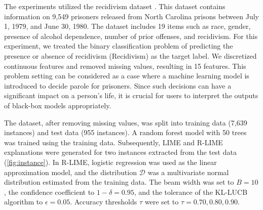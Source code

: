 \documentclass[runningheads]{llncs}
\begin{document}
The experiments utilized the recidivism dataset \cite{schmidt1988predicting}.
This dataset contains information on 9,549 prisoners released from
North Carolina prisons between July 1, 1979, and June 30, 1980.
The dataset includes 19 items such as race, gender,
presence of alcohol dependence, number of prior offenses, and recidivism.
For this experiment, 
we treated the binary classification problem of predicting
the presence or absence of recidivism (Recidivism) as the target label. 
We discretized continuous features and removed missing values,
resulting in 15 features. 
This problem setting can be considered as a case
where a machine learning model is introduced to decide parole for prisoners.
Since such decisions can have a significant impact on a person's life,
it is crucial for users to interpret the outputs of black-box models appropriately.

The dataset, after removing missing values,
was split into training data (7,639 instances) and test data (955 instances).
A random forest model with 50 trees was trained using the training data.
Subsequently, LIME and R-LIME explanations were generated
for two instances extracted from the test data (\cref{fig:instance}).
In R-LIME, logistic regression was used as the linear approximation model, 
and the distribution $\mathcal{D}$ was a multivariate normal distribution
estimated from the training data.
The beam width was set to $B=10$,
the confidence coefficient to $1-\delta=0.95$,
and the tolerance of the KL-LUCB algorithm to $\epsilon=0.05$.
Accuracy thresholds $\tau$ were set to $\tau=0.70,0.80,0.90$.
\end{document}
